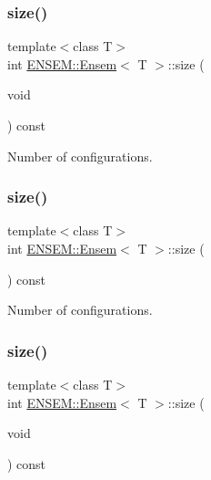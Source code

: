 \subsubsection{\texorpdfstring{size()}{size()}\hspace{0.1cm}{\footnotesize\ttfamily [1/3]}}
{\footnotesize\ttfamily template$<$class T$>$ \\
int \mbox{\hyperlink{classENSEM_1_1Ensem}{E\+N\+S\+E\+M\+::\+Ensem}}$<$ T $>$\+::size (\begin{DoxyParamCaption}\item[{void}]{ }\end{DoxyParamCaption}) const\hspace{0.3cm}{\ttfamily [inline]}}



Number of configurations. 

\mbox{\label{classENSEM_1_1Ensem_ae8cf08459492240dcab13d4ab3a21216}} 
\subsubsection{\texorpdfstring{size()}{size()}\hspace{0.1cm}{\footnotesize\ttfamily [2/3]}}
{\footnotesize\ttfamily template$<$class T$>$ \\
int \mbox{\hyperlink{classENSEM_1_1Ensem}{E\+N\+S\+E\+M\+::\+Ensem}}$<$ T $>$\+::size (\begin{DoxyParamCaption}{ }\end{DoxyParamCaption}) const\hspace{0.3cm}{\ttfamily [inline]}}



Number of configurations. 

\mbox{\label{classENSEM_1_1Ensem_ae8cf08459492240dcab13d4ab3a21216}} 
\subsubsection{\texorpdfstring{size()}{size()}\hspace{0.1cm}{\footnotesize\ttfamily [3/3]}}
{\footnotesize\ttfamily template$<$class T$>$ \\
int \mbox{\hyperlink{classENSEM_1_1Ensem}{E\+N\+S\+E\+M\+::\+Ensem}}$<$ T $>$\+::size (\begin{DoxyParamCaption}\item[{void}]{ }\end{DoxyParamCaption}) const\hspace{0.3cm}{\ttfamily [inline]}}



